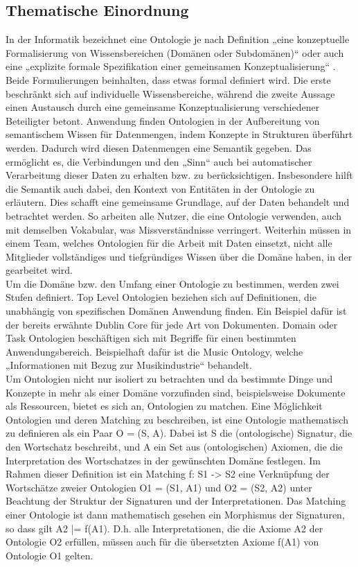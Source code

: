 \subsection{Thematische Einordnung}
In der Informatik bezeichnet eine Ontologie je nach Definition „eine
konzeptuelle Formalisierung von Wissensbereichen (Domänen oder Subdomänen)“ \cite{Bie02}  oder auch eine „explizite formale Spezifikation einer gemeinsamen Konzeptualisierung“ \cite{Hes02} . Beide Formulierungen beinhalten, dass etwas formal definiert wird. Die erste beschränkt sich auf individuelle Wissensbereiche, während die zweite Aussage einen Austausch durch eine gemeinsame Konzeptualisierung verschiedener Beteiligter betont. Anwendung finden Ontologien in der Aufbereitung von semantischem Wissen für Datenmengen, indem Konzepte in Strukturen überführt werden. Dadurch wird diesen Datenmengen eine Semantik gegeben. Das ermöglicht es, die Verbindungen und den „Sinn“ auch bei automatischer Verarbeitung dieser Daten zu erhalten bzw. zu berücksichtigen. Insbesondere hilft die Semantik auch dabei, den Kontext von Entitäten in der Ontologie zu erläutern. \cite{Bie02} Dies schafft eine gemeinsame Grundlage, auf der Daten behandelt und betrachtet werden. So arbeiten alle Nutzer, die eine Ontologie verwenden, auch mit demselben Vokabular, was Missverständnisse verringert. Weiterhin müssen in einem Team, welches Ontologien für die Arbeit mit Daten einsetzt, nicht alle Mitglieder vollständiges und tiefgründiges Wissen über die Domäne haben, in der gearbeitet wird.\\
Um die Domäne bzw. den Umfang einer Ontologie zu bestimmen, werden zwei Stufen
definiert. Top Level Ontologien beziehen sich auf Definitionen, die unabhängig von spezifischen Domänen Anwendung finden. \cite{Bie02}  \cite{Hes02}  Ein Beispiel dafür ist der bereits erwähnte Dublin Core für jede Art von Dokumenten. Domain oder Task Ontologien beschäftigen sich mit Begriffe für einen bestimmten Anwendungsbereich. \cite{Bie02}  \cite{Hes02}  Beispielhaft dafür ist die Music Ontology, welche „Informationen mit Bezug zur Musikindustrie“   behandelt.\\
Um Ontologien nicht nur isoliert zu betrachten und da bestimmte Dinge und
Konzepte in mehr als einer Domäne vorzufinden sind, beispielsweise Dokumente als
Ressourcen, bietet es sich an, Ontologien zu matchen. Eine Möglichkeit Ontologien und deren Matching zu beschreiben, ist eine Ontologie mathematisch zu definieren als ein Paar O = (S, A). Dabei ist S die (ontologische) Signatur, die den Wortschatz beschreibt, und A ein Set aus (ontologischen) Axiomen, die die Interpretation des Wortschatzes in der gewünschten Domäne festlegen. Im Rahmen dieser Definition ist ein Matching f: S1 -> S2 eine Verknüpfung der Wortschätze zweier Ontologien O1 = (S1, A1) und O2 = (S2, A2)  unter Beachtung der Struktur der Signaturen und der Interpretationen. Das Matching einer Ontologie ist dann mathematisch gesehen ein Morphismus der Signaturen, so dass gilt A2 |= f(A1). D.h. alle Interpretationen, die die Axiome A2 der Ontologie O2 erfüllen, müssen auch für die übersetzten Axiome f(A1) von Ontologie O1 gelten. \cite{Hoo14}\\
